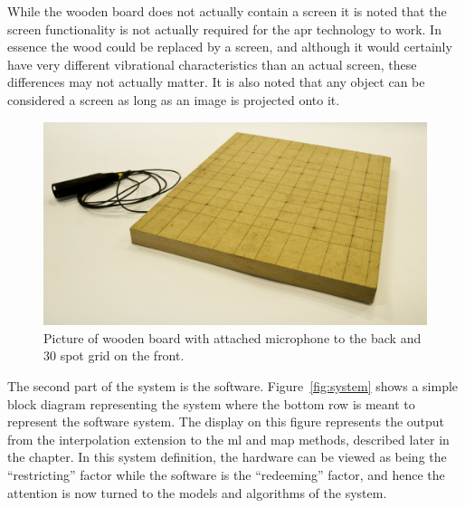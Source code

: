 \label{corrections:wooden}While the wooden board does not actually contain a screen it is noted that the screen functionality is not actually required for the \gls{apr} technology to work. In essence the wood could be replaced by a screen, and although it would certainly have very different vibrational characteristics than an actual screen, these differences may not actually matter. It is also noted that any object can be considered a screen as long as an image is projected onto it.

\begin{figure}[!]
\centering
\includegraphics[width=410 px]{Pad.png}
\caption{Picture of wooden board with attached microphone to the back and 30 spot grid on the front.}\label{fig:Pad}
\end{figure}

The second part of the system is the software. Figure~\ref{fig:system} shows a simple block diagram representing the system where the bottom row is meant to represent the software system. The display on this figure represents the output from the interpolation extension to the \gls{ml} and \gls{map} methods, described later in the chapter. In this system definition, the hardware can be viewed as being the ``restricting'' factor while the software is the ``redeeming'' factor, and hence the attention is now turned to the models and algorithms of the system.

